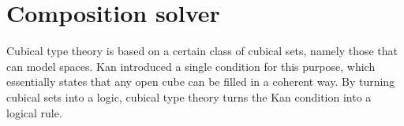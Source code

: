 \documentclass{llncs}
\makeatletter
\newcommand{\continuation}{??}
\newenvironment{examplecontd}[1]
{
  \renewcommand{\continuation}{\ref{#1}}\expcont[continued]
}
{\endexpcont}
\newcommand{\mdef}{:=}
\newcommand{\pint}[1]{\mathbf{1}^{#1}}
\newcommand{\pintrestr}[3]{\mathbf{1}^{#1}_{{#2}={#3}}}
\newcommand{\izero}{\mathsf{0}}
\newcommand{\ione}{\mathsf{1}}
\renewcommand{\dim}[1]{\mathsf{dim}({#1})}
\newcommand{\cont}[2]{\ensuremath{ \ifthenelse{\equal{#2}{}}{#1}{{#1}\langle{#2}\rangle}} }
\newcommand{\boundary}[1]{\partial({#1})}
\makeatother
\begin{document}














\section{Composition solver}
\label{sec:compositionsolver}

Cubical type theory is based on a certain class of cubical sets, namely those
that can model spaces. Kan \cite{kan55_abstr_homot} introduced a single
condition for this purpose, which essentially states that any open cube can be
filled in a coherent way. By turning cubical sets into a logic, cubical type
theory turns the Kan condition into a logical rule.
\end{document}
